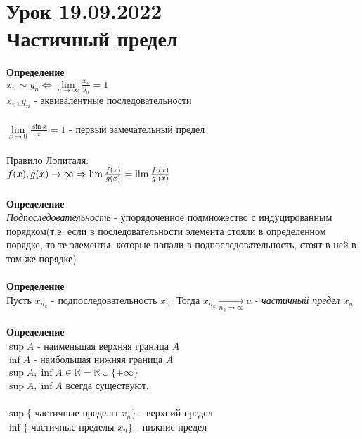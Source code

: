 \documentclass[12pt]{article}
\begin{document}
\section{Урок 19.09.2022\\Частичный предел}
\textbf{Определение}\\
$x_n \sim y_n \Leftrightarrow \lim\limits_{n\rightarrow\infty} \frac{x_n}{y_n} = 1$\\
$x_n, y_n$ - эквивалентные последовательности\\\\
$\lim\limits_{x\rightarrow 0} \frac{\sin x}{x} = 1$ - первый замечательный предел\\\\
Правило Лопиталя:\\
$f(x),g(x) \rightarrow \infty \Rightarrow \lim \frac{f(x)}{g(x)} = \lim \frac{f`(x)}{g`(x)}$\\\\
\textbf{Определение}\\
\textit{Подпоследовательность} - упорядоченное подмножество с индуцированным порядком(т.е. если в последовательности элемента стояли в определенном порядке, то те элементы, которые попали в подпоследовательность, стоят в ней в том же порядке)\\\\
\textbf{Определение}\\
Пусть $x_{n_k}$ - подпоследовательность $x_n$. Тогда $x_{n_k} \xrightarrow[n_k\rightarrow\infty]{} a$ - \textit{частичный предел $x_n$}\\\\
\textbf{Определение}\\
$\sup A$ - наименьшая верхняя граница $A$\\
$\inf A$ - наибольшая нижняя граница $A$\\
$\sup A,\inf A \in \overline{\mathbb{R}} = \mathbb{R}\cup\{\pm\infty\}$\\
$\sup A,\inf A$ всегда существуют.\\\\
$\sup \{\text{ частичные пределы } x_n\}$ - верхний предел\\
$\inf \{\text{ частичные пределы } x_n\}$ - нижние предел\\
\end{document}
